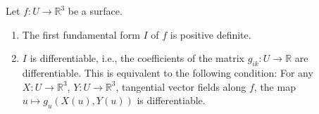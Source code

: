 Let $f: U \rightarrow \mathbb{R}^3$ be a surface.

\begin{enumerate}
\item[i)] The first fundamental form $I$ of $f$ is positive definite.
\item[ii)] $I$ is differentiable, i.e., the coefficients of the matrix $g_{ik}: U \rightarrow \mathbb{R}$ are differentiable. This is equivalent to the following condition: For any $X: U \rightarrow \mathbb{R}^3$, $Y: U \rightarrow \mathbb{R}^3$, tangential vector fields along $f$, the map $u \mapsto g_u(X(u), Y(u))$ is differentiable.
\end{enumerate}